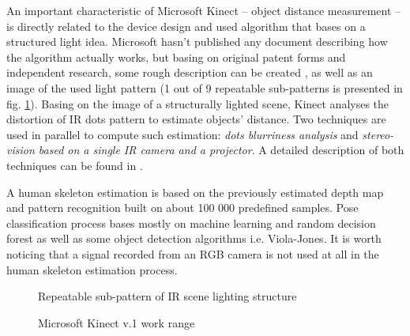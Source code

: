 \documentclass{llncs}
\begin{document}
An important characteristic of Microsoft Kinect -- object distance measurement -- is directly related to the device design and used algorithm that bases on a structured light idea. Microsoft hasn't published any document describing how the algorithm actually works, but basing on original patent forms \cite{patent:20080106746,patent:20100020078,patent:20100118123} and independent research, some rough description can be created \cite{reichinger2011}, as well as an image of the used light pattern (1 out of 9 repeatable sub-patterns is presented in fig. \ref{fig:characteristics:kinect:dotPattern}).
Basing on the image of a structurally lighted scene, Kinect analyses the distortion of IR dots pattern to estimate objects' distance. Two techniques are used in parallel to compute such estimation: \textit{dots blurriness analysis} and \textit{stereo-vision based on a single IR camera and a projector}. A detailed description of both techniques can be found in  \cite{Rzeszotarski2006,Fofi2004}.

A human skeleton estimation is based on the previously estimated depth map and pattern recognition built on about 100 000 predefined samples. Pose classification process bases mostly on machine learning and random decision forest as well as some object detection algorithms i.e. Viola-Jones\cite{Shotton2008,Shotton2011}. It is worth noticing that a signal recorded from an RGB camera is not used at all in the human skeleton estimation process.

\begin{figure}[h!]
	\centering 
	\begin{minipage}[b]{0.49\linewidth}
		\centering
		\vspace{2.5cm}
		\caption[]{Simplified Microsoft Kinect v.1 controller build schema \cite{kinectFixit2016}}
		\label{fig:characteristics:kinect:inside} 
	\end{minipage}
	\begin{minipage}[b]{0.49\linewidth}
		\centering 
		\vspace{2.5cm}
		\caption[]{Repeatable sub-pattern of IR scene lighting structure\cite{reichinger2011}}
		\label{fig:characteristics:kinect:dotPattern}
	\end{minipage}
\end{figure}
		
\begin{figure}[h!] %
	\centering
	\subfigure{
			\vspace{2.5cm}	
	}
	\caption{Microsoft Kinect v.1 work range}
	\label{fig:characteristics:kinect:range}
\end{figure}
		
\end{document}
